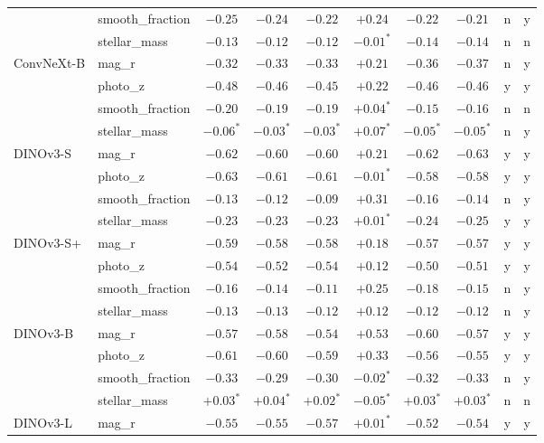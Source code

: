 \begin{tabular}{llcccccccc}
 & smooth\_fraction & $-0.25$ & $-0.24$ & $-0.22$ & $+0.24$ & $-0.22$ & $-0.21$ & n & y \\
 & stellar\_mass & $-0.13$ & $-0.12$ & $-0.12$ & $-0.01^{*}$ & $-0.14$ & $-0.14$ & n & n \\
\addlinespace[2pt]
ConvNeXt-B & mag\_r & $-0.32$ & $-0.33$ & $-0.33$ & $+0.21$ & $-0.36$ & $-0.37$ & n & y \\
 & photo\_z & $-0.48$ & $-0.46$ & $-0.45$ & $+0.22$ & $-0.46$ & $-0.46$ & y & y \\
 & smooth\_fraction & $-0.20$ & $-0.19$ & $-0.19$ & $+0.04^{*}$ & $-0.15$ & $-0.16$ & n & n \\
 & stellar\_mass & $-0.06^{*}$ & $-0.03^{*}$ & $-0.03^{*}$ & $+0.07^{*}$ & $-0.05^{*}$ & $-0.05^{*}$ & n & y \\
\addlinespace[2pt]
DINOv3-S & mag\_r & $-0.62$ & $-0.60$ & $-0.60$ & $+0.21$ & $-0.62$ & $-0.63$ & y & y \\
 & photo\_z & $-0.63$ & $-0.61$ & $-0.61$ & $-0.01^{*}$ & $-0.58$ & $-0.58$ & y & y \\
 & smooth\_fraction & $-0.13$ & $-0.12$ & $-0.09$ & $+0.31$ & $-0.16$ & $-0.14$ & n & y \\
 & stellar\_mass & $-0.23$ & $-0.23$ & $-0.23$ & $+0.01^{*}$ & $-0.24$ & $-0.25$ & y & y \\
\addlinespace[2pt]
DINOv3-S+ & mag\_r & $-0.59$ & $-0.58$ & $-0.58$ & $+0.18$ & $-0.57$ & $-0.57$ & y & y \\
 & photo\_z & $-0.54$ & $-0.52$ & $-0.54$ & $+0.12$ & $-0.50$ & $-0.51$ & y & y \\
 & smooth\_fraction & $-0.16$ & $-0.14$ & $-0.11$ & $+0.25$ & $-0.18$ & $-0.15$ & n & y \\
 & stellar\_mass & $-0.13$ & $-0.13$ & $-0.12$ & $+0.12$ & $-0.12$ & $-0.12$ & n & y \\
\addlinespace[2pt]
DINOv3-B & mag\_r & $-0.57$ & $-0.58$ & $-0.54$ & $+0.53$ & $-0.60$ & $-0.57$ & y & y \\
 & photo\_z & $-0.61$ & $-0.60$ & $-0.59$ & $+0.33$ & $-0.56$ & $-0.55$ & y & y \\
 & smooth\_fraction & $-0.33$ & $-0.29$ & $-0.30$ & $-0.02^{*}$ & $-0.32$ & $-0.33$ & n & y \\
 & stellar\_mass & $+0.03^{*}$ & $+0.04^{*}$ & $+0.02^{*}$ & $-0.05^{*}$ & $+0.03^{*}$ & $+0.03^{*}$ & n & n \\
\addlinespace[2pt]
DINOv3-L & mag\_r & $-0.55$ & $-0.55$ & $-0.57$ & $+0.01^{*}$ & $-0.52$ & $-0.54$ & y & y \\

\end{tabular}
